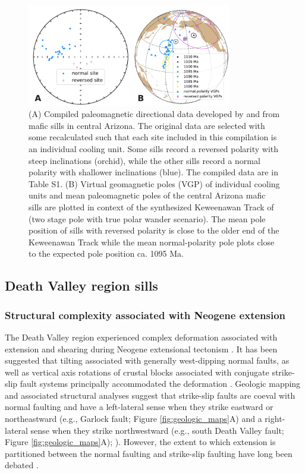 \begin{figure}[h!]
\centering
\includegraphics[width=0.8\textwidth]{figure/Zhang2024b/Harlan_Donadini_compilation.pdf}
\caption{(A) Compiled paleomagnetic directional data developed by  and  from mafic sills in central Arizona. The original data are selected with some recalculated such that each site included in this compilation is an individual cooling unit. Some sills record a reversed polarity with steep inclinations (orchid), while the other sills record a normal polarity with shallower inclinations (blue). The compiled data are in Table S1. (B) Virtual geomagnetic poles (VGP) of individual cooling units and mean paleomagnetic poles of the central Arizona mafic sills are plotted in context of the synthesized Keweenawan Track of  (two stage pole with true polar wander scenario). The mean pole position of sills with reversed polarity is close to the older end of the Keweenawan Track while the mean normal-polarity pole plots close to the expected pole position ca. 1095 Ma.}
\label{fig:Harlan_Donadini_compilation}
\end{figure}

\subsection*{Death Valley region sills}
\subsubsection*{Structural complexity associated with Neogene extension}

The Death Valley region experienced complex deformation associated with extension and shearing during Neogene extensional tectonism \cite[e.g.][]{Wernicke1988a}. It has been suggested that tilting associated with generally west-dipping normal faults, as well as vertical axis rotations of crustal blocks associated with conjugate strike-slip fault systems principally accommodated the deformation \cite[e.g.][]{Serpa1996a}. Geologic mapping and associated structural analyses suggest that strike-slip faults are coeval with normal faulting and have a left-lateral sense when they strike eastward or northeastward (e.g., Garlock fault; Figure \ref{fig:geologic_maps}A) and a right-lateral sense when they strike northwestward (e.g., south Death Valley fault;  Figure \ref{fig:geologic_maps}A); ). However, the extent to which extension is partitioned between the normal faulting and strike-slip faulting have long been debated \cite[e.g.][]{Burchfiel1965a, Guth1981a, Snow1989a, Holm1993a, Petronis2002a, Renik2013a}. 

